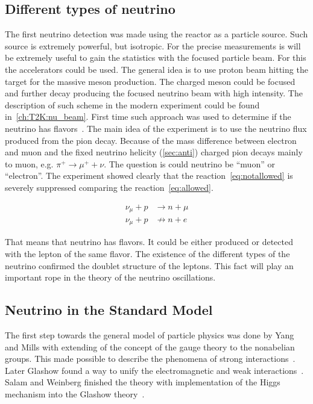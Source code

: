 \documentclass[../main.tex]{subfiles}
\begin{document}
\subsection{Different types of neutrino}
\label{sec:dublet}
The first neutrino detection was made using the reactor as a particle source. Such source is extremely powerful, but isotropic. For the precise measurements is will be extremely useful to gain the statistics with the focused particle beam. For this the accelerators could be used. The general idea is to use proton beam hitting the target for the massive meson production. The charged meson could be focused and further decay producing the focused neutrino beam with high intensity. The description of such scheme in the modern experiment could be found in~\autoref{ch:T2K:nu_beam}. First time such approach was used to determine if the neutrino has flavors~\cite{Danby1962}. The main idea of the experiment is to use the neutrino flux produced from the pion decay. Because of the mass difference between electron and muon and the fixed neutrino helicity (\autoref{sec:anti}) charged pion decays mainly to muon, e.g. $\pi^+\to\mu^++\nu$. The question is could neutrino be ``muon'' or ``electron''. The experiment showed clearly that the reaction~\autoref{eq:notallowed} is severely suppressed comparing the reaction~\autoref{eq:allowed}.

\begin{align}
\label{eq:allowed}
\nu_\mu+p&\rightarrow n+\mu \\
\nu_\mu+p&\nrightarrow n+e
\label{eq:notallowed}
\end{align}

That means that neutrino has flavors. It could be either produced or detected with the lepton of the same flavor. The existence of the different types of the neutrino confirmed the doublet structure of the leptons. This fact will play an important rope in the theory of the neutrino oscillations.


\subsection{Neutrino in the Standard Model}
\label{sec:sm}

The first step towards the general model of particle physics was done by Yang and Mills with extending of the concept of the gauge theory to the nonabelian groups. This made possible to describe the phenomena of strong interactions~\cite{Yang1954}. Later Glashow found a way to unify the electromagnetic and weak interactions~\cite{Glashow1961}. Salam and Weinberg finished the theory with implementation of the Higgs mechanism into the Glashow theory~\cite{Weinberg1967}.
\end{document}

